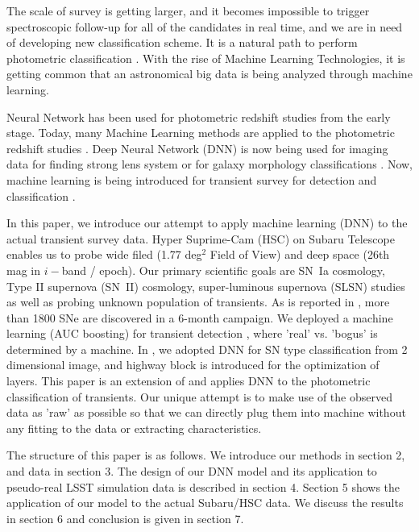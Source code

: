 \documentclass[useamsfonts]{pasj01}
\begin{document}
The scale of survey is getting larger, and it becomes impossible to trigger spectroscopic follow-up for all of the candidates in real time, and we are in need of developing new classification scheme.  It is a natural path to perform photometric classification \citep{sako11a,jonesl8a}.  With the rise of Machine Learning Technologies, it is getting common that an astronomical big data is being analyzed through machine learning.   

Neural Network has been used for photometric redshift studies from the early stage.  Today, many Machine Learning methods are applied to the photometric redshift studies \citep{collister04a,carliles10a,pasquet19a}.
Deep Neural Network (DNN) is now being used for imaging data for finding strong lens system \citep{petrillo17a} or for galaxy morphology classifications \citep{hausen19a}.  Now, machine learning is being introduced for transient survey for detection \citep{goldstein15a} and classification \citep{charnock17a}.

In this paper, we introduce our attempt to apply machine learning (DNN) to the actual transient survey data.
Hyper Suprime-Cam (HSC) \citep{miyazaki18a,Komiyama2018,kawanomoto18a,Furusawa2018} on Subaru Telescope enables us to probe wide filed (1.77 deg$^2$ Field of View) and deep space (26th mag in $i-$band / epoch).  Our primary scientific goals are SN~Ia cosmology, Type II supernova (SN~II) cosmology, super-luminous supernova (SLSN) studies as well as probing unknown population of transients.  
As is reported in \citet{yasuda19a}, more than 1800 SNe are discovered in a 6-month campaign. 
We deployed a machine learning (AUC boosting) for transient detection \citep{morii16a}, where 'real' vs. 'bogus' is determined by a machine.
In \citet{Kimura17}, we adopted DNN for SN type classification from 2 dimensional image, and highway block is introduced for the optimization of layers.
This paper is an extension of \citet{Kimura17} and applies DNN to the photometric classification of transients.   
Our unique attempt is to make use of the observed data as 'raw' as possible so that we can directly plug them into machine without any fitting to the data or extracting characteristics.

The structure of this paper is as follows. We introduce our methods in section 2, and data in section 3. The design of our DNN model and its application to pseudo-real LSST simulation data is described in section 4. Section 5 shows the application of our model to the actual Subaru/HSC data. We discuss the results in section 6 and conclusion is given in section 7.
%
%
\end{document}
